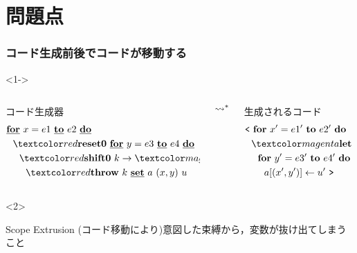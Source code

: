 \section{問題点}



\begin{frame}
  \frametitle{コード生成前後でコードが移動する}
  \begin{visibleenv}<1->
    \begin{columns}
      \begin{column}{0.5\textwidth}%
        コード生成器
        \begin{align*}
          & \cfordo{x = e1}{e2} \\
          & ~~\red{\Resetz~} \cfordo{y = e3}{e4} \\
          & ~~~~\red{\Shiftz~} k \to \magenta{\cLet~ u = y ~ \cIn} \\
          & ~~~~~~\red{\Throw~} k~ \caryset{a}{(x,y)}{u}
        \end{align*}
      \end{column}
      $\leadsto^*$
      \begin{column}{0.5\textwidth}%
        生成されるコード
        \begin{align*}
          & \cbra~ \fordo{x' = e1'}{e2'} \\
          & ~~\magenta{\Let~ u' = y' ~ \In} \\
          & ~~~~\fordo{y' = e3'}{e4'} \\
          & ~~~~~~\aryset{a}{(x',y')}{u'}~ \cket
        \end{align*}
      \end{column}
    \end{columns}
  \end{visibleenv}

  \begin{visibleenv}<2>
    \begin{exampleblock}{Scope Extrusion}
      (コード移動により)意図した束縛から，変数が抜け出てしまうこと
    \end{exampleblock}
  \end{visibleenv}
\end{frame}

